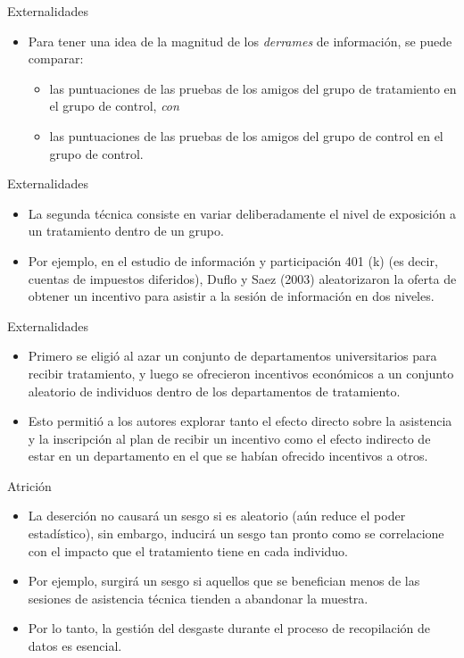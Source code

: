 \documentclass[11pt, aspectratio=169, compress]{beamer}
\begin{document}
\begin{frame}{Externalidades}
	\begin{itemize}
		\item Para tener una idea de la magnitud de los \textit{derrames} de información, se puede comparar:
		\begin{itemize}
			\item las puntuaciones de las pruebas de los amigos del grupo de tratamiento en el grupo de control, \textit{con}
			\item las puntuaciones de las pruebas de los amigos del grupo de control en el grupo de control.
		\end{itemize}
	\end{itemize}
\end{frame}
\begin{frame}{Externalidades}
	\begin{itemize}
		\item La segunda técnica consiste en variar deliberadamente el nivel de exposición a un tratamiento dentro de un grupo.
		
		\item Por ejemplo, en el estudio de información y participación 401 (k) (es decir, cuentas de impuestos diferidos), Duflo y Saez (2003) aleatorizaron la oferta de obtener un incentivo para asistir a la sesión de información en dos niveles.
	\end{itemize}
\end{frame}
\begin{frame}{Externalidades}
	\begin{itemize}
		\item Primero se eligió al azar un conjunto de departamentos universitarios para recibir tratamiento, y luego se ofrecieron incentivos económicos a un conjunto aleatorio de individuos dentro de los departamentos de tratamiento.
		
		\item Esto permitió a los autores explorar tanto el efecto directo sobre la asistencia y la inscripción al plan de recibir un incentivo como el efecto indirecto de estar en un departamento en el que se habían ofrecido incentivos a otros.
	\end{itemize}
\end{frame}
\begin{frame}{Atrición}
	\begin{itemize}
		\item La deserción no causará un sesgo si es aleatorio (aún reduce el poder estadístico), sin embargo, inducirá un sesgo tan pronto como se correlacione con el impacto que el tratamiento tiene en cada individuo.
		\item Por ejemplo, surgirá un sesgo si aquellos que se benefician menos de las sesiones de asistencia técnica tienden a abandonar la muestra. 
		\item Por lo tanto, la gestión del desgaste durante el proceso de recopilación de datos es esencial.
	\end{itemize}
\end{frame}
\end{document}
